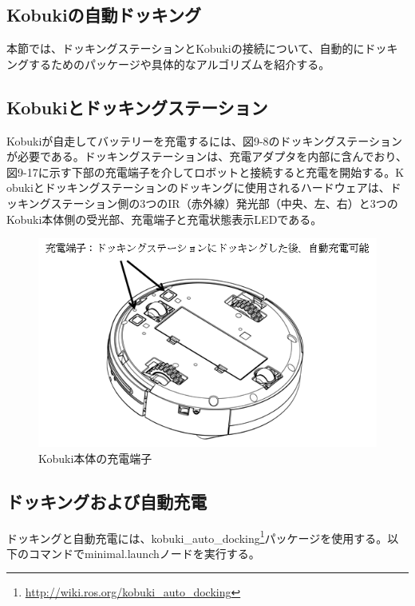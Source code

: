 \begin{itemize}
\section{Kobukiの自動ドッキング}

本節では、ドッキングステーションとKobukiの接続について、自動的にドッキングするためのパッケージや具体的なアルゴリズムを紹介する。

  \subsection{Kobukiとドッキングステーション}

Kobukiが自走してバッテリーを充電するには、図9-8のドッキングステーションが必要である。ドッキングステーションは、充電アダプタを内部に含んでおり、図9-17に示す下部の充電端子を介してロボットと接続すると充電を開始する。K obukiとドッキングステーションのドッキングに使用されるハードウェアは、ドッキングステーション側の3つのIR（赤外線）発光部（中央、左、右）と3つのKobuki本体側の受光部、充電端子と充電状態表示LEDである。

\begin{figure}[htp]
  \centering
  \includegraphics[width=12cm]{pictures/chapter9/pic_09_17.png}
  \caption{Kobuki本体の充電端子}
\end{figure}

\subsection{ドッキングおよび自動充電}

ドッキングと自動充電には、kobuki\_auto\_docking\footnote{\url{http://wiki.ros.org/kobuki\_auto\_docking}}パッケージを使用する。以下のコマンドでminimal.launchノードを実行する。


\end{itemize}

